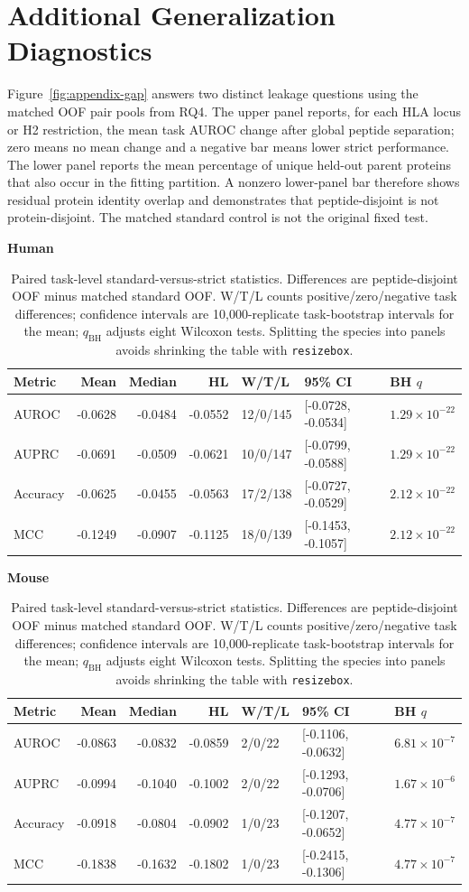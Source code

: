 \section{Additional Generalization Diagnostics}

Figure~\ref{fig:appendix-gap} answers two distinct leakage questions using the matched OOF pair pools from RQ4. The upper panel reports, for each HLA locus or H2 restriction, the mean task AUROC change after global peptide separation; zero means no mean change and a negative bar means lower strict performance. The lower panel reports the mean percentage of unique held-out parent proteins that also occur in the fitting partition. A nonzero lower-panel bar therefore shows residual protein identity overlap and demonstrates that peptide-disjoint is not protein-disjoint. The matched standard control is not the original fixed test.

\begin{table}[htbp]
\centering
\caption{Paired task-level standard-versus-strict statistics. Differences are peptide-disjoint OOF minus matched standard OOF. W/T/L counts positive/zero/negative task differences; confidence intervals are 10,000-replicate task-bootstrap intervals for the mean; \(q_{\mathrm{BH}}\) adjusts eight Wilcoxon tests. Splitting the species into panels avoids shrinking the table with \texttt{resizebox}.}
\label{tab:paired-stats}
\small
\setlength{\tabcolsep}{1pt}
\textbf{Human}\par\smallskip
\begin{tabular}{lrrrlll}
\toprule
Metric & Mean & Median & HL & W/T/L & 95\% CI & BH $q$ \\ 
\midrule
AUROC & -0.0628 & -0.0484 & -0.0552 & 12/0/145 & [-0.0728, -0.0534] & $1.29\times10^{-22}$ \\ 
AUPRC & -0.0691 & -0.0509 & -0.0621 & 10/0/147 & [-0.0799, -0.0588] & $1.29\times10^{-22}$ \\ 
Accuracy & -0.0625 & -0.0455 & -0.0563 & 17/2/138 & [-0.0727, -0.0529] & $2.12\times10^{-22}$ \\ 
MCC & -0.1249 & -0.0907 & -0.1125 & 18/0/139 & [-0.1453, -0.1057] & $2.12\times10^{-22}$ \\ 
\bottomrule
\end{tabular}
\par\medskip
\textbf{Mouse}\par\smallskip
\begin{tabular}{lrrrlll}
\toprule
Metric & Mean & Median & HL & W/T/L & 95\% CI & BH $q$ \\ 
\midrule
AUROC & -0.0863 & -0.0832 & -0.0859 & 2/0/22 & [-0.1106, -0.0632] & $6.81\times10^{-7}$ \\ 
AUPRC & -0.0994 & -0.1040 & -0.1002 & 2/0/22 & [-0.1293, -0.0706] & $1.67\times10^{-6}$ \\ 
Accuracy & -0.0918 & -0.0804 & -0.0902 & 1/0/23 & [-0.1207, -0.0652] & $4.77\times10^{-7}$ \\ 
MCC & -0.1838 & -0.1632 & -0.1802 & 1/0/23 & [-0.2415, -0.1306] & $4.77\times10^{-7}$ \\ 
\bottomrule
\end{tabular}
\end{table}

